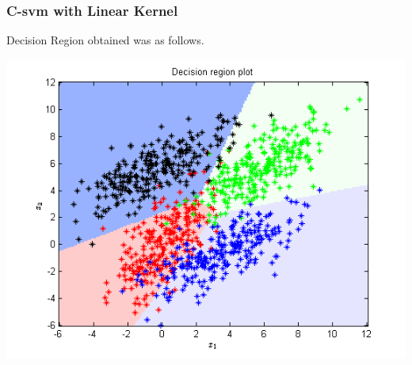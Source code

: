 \documentclass{article}
\begin{document}
\subsubsection{C-svm with Linear Kernel}

Decision Region obtained was as follows.
\begin{center}
\includegraphics[scale=1]{Classification/1c/c_linear/dec}
\end{center}
\end{document}
